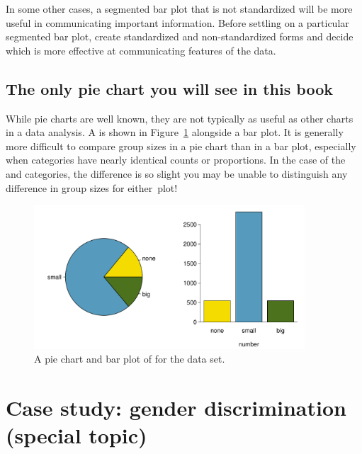 In some other cases, a segmented bar plot that is not standardized will be more useful in communicating important information. Before settling on a particular segmented bar plot, create standardized and non-standardized forms and decide which is more effective at communicating features of the data.


\subsection{The only pie chart you will see in this book}

While pie charts are well known, they are not typically as useful as other charts in a data analysis. A  is shown in Figure~\ref{emailNumberPieChart} alongside a bar plot. It is generally more difficult to compare group sizes in a pie chart than in a bar plot, especially when categories have nearly identical counts or proportions. In the case of the  and  categories, the difference is so slight you may be unable to distinguish any difference in group sizes for either~plot!

\begin{figure}
   \centering
   \includegraphics[width=0.9\textwidth]{ch_summarizing_data/figures/emailNumberPieChart/emailNumberPieChart}
   \caption{A pie chart and bar plot of  for the  data set.}
   \label{emailNumberPieChart}
\end{figure}



\section[Case study: gender discrimination (special topic)]{Case study: gender discrimination (special topic) ~}
\label{caseStudyGenderDiscrimination}

